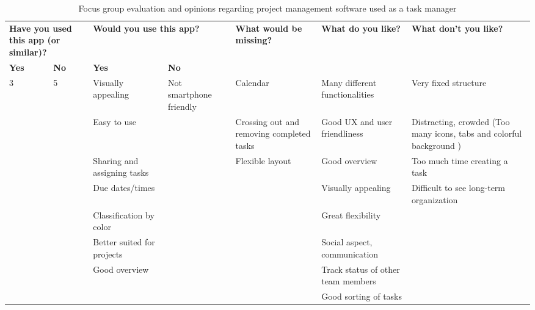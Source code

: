 \FloatBarrier
\begin{table}[!htbp]
    \centering
    \begin{adjustbox}{width=1.2\textwidth,center=\textwidth}
        \begin{tabular}{|l|l|l|l|l|l|l|}
        \hline
        \multicolumn{2}{|l}{\textbf{Have you used this app (or similar)?}} & \multicolumn{2}{|l|}{\textbf{Would you use this app?}} & \multirow{2}{*}{\textbf{What would be missing?}} & \multirow{2}{*}{\textbf{What do you like?}} & \multirow{2}{*}{\textbf{What don't you like?}} \\ \cline{1-4}
        \textbf{Yes} & \textbf{No} & \textbf{Yes} & \textbf{No} & & & \\
        \hline
        \multirow{8}{*}{ 3 } & \multirow{8}{*}{ 5 } & Visually appealing & Not smartphone friendly & Calendar & Many different functionalities & Very fixed structure \\ \cline{3-7}
        & & Easy to use & & Crossing out and removing completed tasks & Good UX and user friendliness & Distracting, crowded (Too many icons, tabs and colorful background ) \\ \cline{3-7}
        & & Sharing and assigning tasks & & Flexible layout & Good overview & Too much time creating a task \\ \cline{3-7}
        & & Due dates/times & & & Visually appealing & Difficult to see long-term organization \\ \cline{3-7}
        & & Classification by color & & & Great flexibility & \\ \cline{3-7}
        & & Better suited for projects & & & Social aspect, communication & \\ \cline{3-7}
        & & Good overview & & & Track status of other team members & \\ \cline{3-7}
        & & & & & Good sorting of tasks & \\ \hline
        \end{tabular}
    \end{adjustbox}
    \caption{Focus group evaluation and opinions regarding project management software used as a task manager}
    \label{tab:projectManEval}
\end{table}
\FloatBarrier

